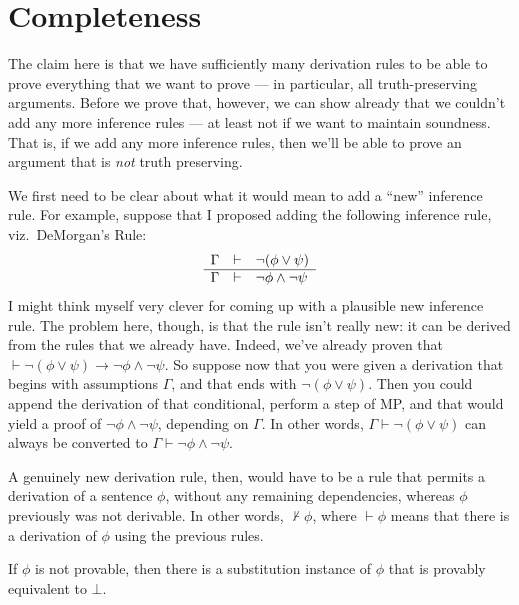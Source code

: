 \section{Completeness}

The claim here is that we have sufficiently many derivation rules to
be able to prove everything that we want to prove --- in particular,
all truth-preserving arguments.  Before we prove that, however, we can
show already that we couldn't add any more inference rules --- at
least not if we want to maintain soundness.  That is, if we add any
more inference rules, then we'll be able to prove an argument that is
{\it not} truth preserving.

We first need to be clear about what it would mean to add a ``new''
inference rule.  For example, suppose that I proposed adding the
following inference rule, viz.\ DeMorgan's Rule:
\[ \begin{array}{r c l} \Gamma & \vdash & \neg (\phi\vee\psi ) \\
    \hline \Gamma & \vdash & \neg\phi\wedge\neg\psi \end{array} \] I
might think myself very clever for coming up with a plausible new
inference rule.  The problem here, though, is that the rule isn't
really new: it can be derived from the rules that we already have.
Indeed, we've already proven that
$\vdash \neg (\phi\vee\psi )\to \neg\phi\wedge\neg\psi$.  So suppose
now that you were given a derivation that begins with assumptions
$\Gamma$, and that ends with $\neg (\phi\vee\psi )$.  Then you could
append the derivation of that conditional, perform a step of MP, and
that would yield a proof of $\neg\phi\wedge\neg\psi$, depending on
$\Gamma$.  In other words, $\Gamma\vdash \neg (\phi\vee\psi )$ can
always be converted to $\Gamma\vdash\neg\phi\wedge\neg\psi$.

A genuinely new derivation rule, then, would have to be a rule that
permits a derivation of a sentence $\phi$, without any remaining
dependencies, whereas $\phi$ previously was not derivable.  In other
words, $\not\vdash\phi$, where $\vdash\phi$ means that there is a
derivation of $\phi$ using the previous rules.

\begin{prop} If $\phi$ is not provable, then there is a substitution
  instance of $\phi$ that is provably equivalent to
  $\bot$. \end{prop}

